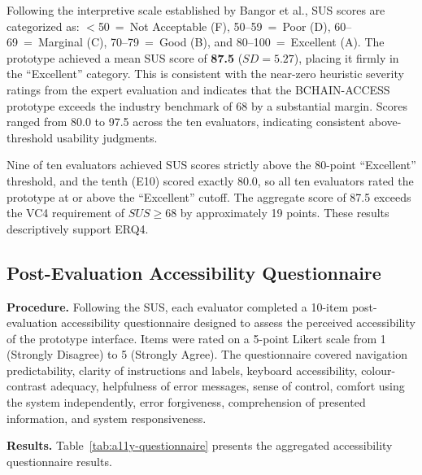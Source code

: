 \documentclass[journal,onecolumn]{IEEEtran}
\begin{document}
Following the interpretive scale established by
Bangor et al.\cite{bangor2008empirical}, SUS scores are categorized as:
$<$50~=~Not Acceptable (F), 50--59~=~Poor (D), 60--69~=~Marginal (C),
70--79~=~Good (B), and 80--100~=~Excellent (A). The prototype achieved
a mean SUS score of \textbf{87.5} ($SD = 5.27$), placing it firmly in
the ``Excellent'' category. This is consistent with the near-zero
heuristic severity ratings from the expert evaluation and indicates that the BCHAIN-ACCESS prototype exceeds the industry benchmark of 68
\cite{sauro2011} by a substantial margin. Scores ranged from 80.0 to 97.5
across the ten evaluators, indicating consistent above-threshold usability
judgments.

Nine of ten evaluators achieved SUS scores strictly above the 80-point ``Excellent''
threshold, and the tenth (E10) scored exactly 80.0, so all ten evaluators rated the
prototype at or above the ``Excellent'' cutoff. The aggregate score of 87.5 exceeds the VC4 requirement
of $SUS \geq 68$ by approximately 19 points. These results descriptively support ERQ4.

\subsection{Post-Evaluation Accessibility Questionnaire}
\label{subsec:a11y-questionnaire}

\noindent\textbf{Procedure.} 
Following the SUS, each evaluator completed a 10-item post-evaluation
accessibility questionnaire designed to assess the perceived accessibility
of the prototype interface. Items were rated on a 5-point Likert scale
from 1 (Strongly Disagree) to 5 (Strongly Agree). The questionnaire
covered navigation predictability, clarity of instructions and labels,
keyboard accessibility, colour-contrast adequacy, helpfulness of error
messages, sense of control, comfort using the system independently, error
forgiveness, comprehension of presented information, and system
responsiveness.

\noindent\textbf{Results.} 
Table~\ref{tab:a11y-questionnaire} presents the aggregated accessibility
questionnaire results.
\end{document}

